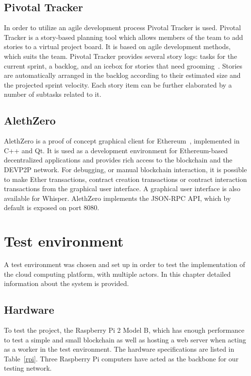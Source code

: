 \subsection{Pivotal Tracker}
In order to utilize an agile development process Pivotal Tracker is used. Pivotal Tracker is a story-based planning tool which allows members of the team to add stories to a virtual project board. It is based on agile development methods, which suits the team. Pivotal Tracker provides several story logs: tasks for the current sprint, a backlog, and an icebox for stories that need grooming~\cite{pivotaltracker}. Stories are automatically arranged in the backlog according to their estimated size and the projected sprint velocity. Each story item can be further elaborated by a number of subtasks related to it. 

\subsection{AlethZero}
AlethZero is a proof of concept graphical client for Ethereum~\cite{github-alethzero}, implemented in C++ and Qt. It is used as a development environment for Ethereum-based decentralized applications and provides rich access to the blockchain and the DEVP2P network. For debugging, or manual blockchain interaction, it is possible to make Ether transactions, contract creation transactions or contract interaction transactions from the graphical user interface. A graphical user interface is also available for Whisper. AlethZero implements the JSON-RPC API, which by default is exposed on port 8080.

\section{Test environment}
A test environment was chosen and set up in order to test the implementation of the cloud computing platform, with multiple actors. In this chapter detailed information about the system is provided.

\subsection{Hardware}
To test the project, the Raspberry Pi 2 Model B, which has enough performance to test a simple and small blockchain as well as hosting a web server when acting as a worker in the test environment. The hardware specifications are listed in Table~\ref{rpi}. Three Raspberry Pi computers have acted as the backbone for our testing network.

